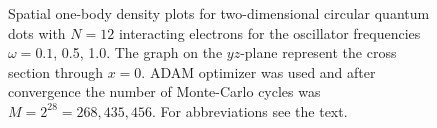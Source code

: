 \begin{landscape}
\begin{figure} [H]
		\caption{Spatial one-body density plots for two-dimensional circular quantum dots with $N=12$ interacting electrons for the oscillator frequencies $\omega=0.1$, 0.5, 1.0. The graph on the $yz$-plane represent the cross section through $x=0$. ADAM optimizer was used and after convergence the number of Monte-Carlo cycles was $M=2^{28}=268,435,456$. For abbreviations see the text.}%
		\label{fig:OB2_interaction_12P}
	\end{figure}
	\begin{figure} [H]%
		\centering
		\captionsetup[subfigure]{labelformat=empty}
		\captionsetup{width=0.9\hsize}
		\hspace{0.1cm}
		\hspace{-0.0cm}
		\hspace{-0.0cm}
		\hspace{-0.0cm}
		\\ [-0.3cm]
		

\end{figure}
\end{landscape}
